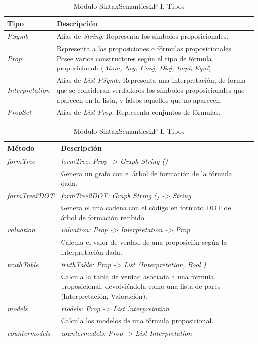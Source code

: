 \documentclass[a4paper]{report}
\begin{document}
\begin{table}[H]
\centering
\begin{tabular}{p{3cm} p{13.2cm}}
\hline
Tipo & Descripción\\
\hline
\hline
\textit{PSymb} & Alias de \textit{String}. Representa los símbolos proposicionales.\\
\hline
\textit{Prop}& Representa a las proposiciones o fórmulas proposicionales. Posee varios constructores según el tipo de fórmula proposicional: (\textit{Atom, Neg, Conj, Disj, Impl, Equi}).\\
\hline
\textit{Interpretation}& Alias de \textit{List PSymb}. Representa una interpretación, de forma que se consideran verdaderos los símbolos proposicionales que aparecen en la lista, y falsos aquellos que no aparecen.\\
\hline
\textit{PropSet}& Alias de \textit{List Prop}. Representa conjuntos de fórmulas.\\
\hline
\end{tabular}
\caption{Módulo SintaxSemanticsLP I. Tipos}
\vspace{0.5cm}
\begin{tabular}{p{3cm} p{13.2cm}}
\hline
Método & Descripción\\
\hline
\hline
\textit{formTree}& \textit{formTree: Prop -> Graph String ()}\\
& Genera un grafo con el árbol de formación de la fórmula dada.\\
\hline
\textit{formTree2DOT}& \textit{formTree2DOT: Graph String () -> String}\\
& Genera el una cadena con el código en formato DOT del árbol de formación recibido.\\
\hline
\textit{valuation}& \textit{valuation: Prop -> Interpretation -> Prop}\\
& Calcula el valor de verdad de una proposición según la interpretación dada.\\
\hline
\textit{truthTable}& \textit{truthTable: Prop -> List (Interpretation, Bool
)}\\
& Calcula la tabla de verdad asociada a una fórmula proposicional, devolviéndola como una lista de pares (Interpretación, Valoración).\\
\hline
\textit{models}& \textit{models: Prop -> List Interpretation}\\
& Calcula los modelos de una fórmula proposicional.\\
\hline
\textit{countermodels}& \textit{countermodels: Prop -> List Interpretation}\\

\end{tabular}
\end{table}
\end{document}

